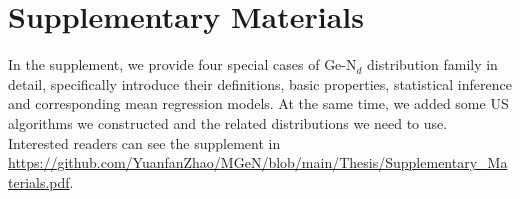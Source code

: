 \section*{Supplementary Materials}\label{zyf.four.sec:SM}      %

In the supplement, we provide four special cases of Ge-N$_d$ distribution family in detail, specifically introduce their definitions, basic properties, statistical inference and corresponding mean regression models. At the same time, we added some US algorithms we constructed and the related distributions we need to use. Interested readers can see the supplement in \href{https://github.com/YuanfanZhao/MGeN/blob/main/Thesis/Supplementary_Materials.pdf}{https://github.com/YuanfanZhao/MGeN/blob/main/Thesis/Supplementary\_Materials.pdf}.